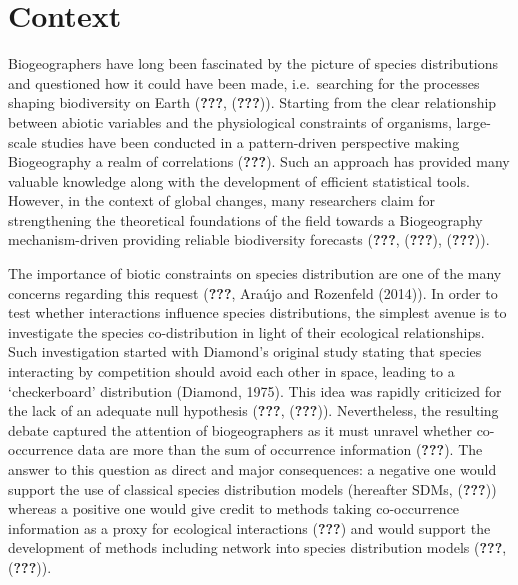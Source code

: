 \section{Context}\label{context}

Biogeographers have long been fascinated by the picture of species
distributions and questioned how it could have been made, i.e.~searching
for the processes shaping biodiversity on Earth ({\textbf{???}},
({\textbf{???}})). Starting from the clear relationship between abiotic
variables and the physiological constraints of organisms, large-scale
studies have been conducted in a pattern-driven perspective making
Biogeography a realm of correlations ({\textbf{???}}). Such an approach
has provided many valuable knowledge along with the development of
efficient statistical tools. However, in the context of global changes,
many researchers claim for strengthening the theoretical foundations of
the field towards a Biogeography mechanism-driven providing reliable
biodiversity forecasts ({\textbf{???}}, ({\textbf{???}}),
({\textbf{???}})).

The importance of biotic constraints on species distribution are one of
the many concerns regarding this request ({\textbf{???}}, Araújo and
Rozenfeld (2014)). In order to test whether interactions influence
species distributions, the simplest avenue is to investigate the species
co-distribution in light of their ecological relationships. Such
investigation started with Diamond's original study stating that species
interacting by competition should avoid each other in space, leading to
a `checkerboard' distribution (Diamond, 1975). This idea was rapidly
criticized for the lack of an adequate null hypothesis ({\textbf{???}},
({\textbf{???}})). Nevertheless, the resulting debate captured the
attention of biogeographers as it must unravel whether co-occurrence
data are more than the sum of occurrence information ({\textbf{???}}).
The answer to this question as direct and major consequences: a negative
one would support the use of classical species distribution models
(hereafter SDMs, ({\textbf{???}})) whereas a positive one would give
credit to methods taking co-occurrence information as a proxy for
ecological interactions ({\textbf{???}}) and would support the
development of methods including network into species distribution
models ({\textbf{???}}, ({\textbf{???}})).

